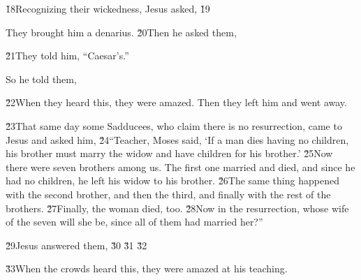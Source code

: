\v{18}Recognizing their wickedness, Jesus asked,  \v{19}

They brought him a denarius. \v{20}Then he asked them, 

\v{21}They told him, ``Caesar's.''

So he told them, 

\v{22}When they heard this, they were amazed. Then they left him and went away.

\v{23}That same day some Sadducees, who claim there is no resurrection, came to Jesus and asked him, \v{24}``Teacher, Moses said, `If a man dies having no children, his brother must marry the widow and have children for his brother.' \v{25}Now there were seven brothers among us. The first one married and died, and since he had no children, he left his widow to his brother. \v{26}The same thing happened with the second brother, and then the third, and finally with the rest of the brothers. \v{27}Finally, the woman died, too. \v{28}Now in the resurrection, whose wife of the seven will she be, since all of them had married her?''

\v{29}Jesus answered them,  \v{30}   \v{31} \v{32}  

\v{33}When the crowds heard this, they were amazed at his teaching.

